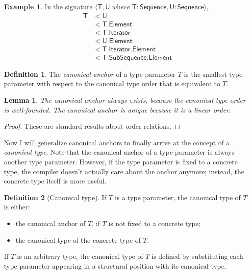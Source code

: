 \documentclass[headsepline,bibliography=totoc]{scrreport}
\newcommand{\namesym}[1]{\mathsf{#1}}
\newcommand{\genericparam}[1]{\bm{\mathsf{#1}}}
\newcommand{\proto}[1]{\bm{\mathsf{#1}}}
\newcommand{\gensig}[2]{\langle #1\;\textit{where}\;#2\rangle}
\newtheorem{lemma}{Lemma}[chapter]
\theoremstyle{definition}
\newtheorem{example}{Example}[chapter]
\theoremstyle{definition}
\newtheorem{definition}{Definition}[chapter]
\theoremstyle{definition}
\begin{document}
\begin{example} In the signature
$\gensig{\genericparam{T},\genericparam{U}}
{\genericparam{T}\colon \proto{Sequence},
\genericparam{U}\colon \proto{Sequence}}$,
\begin{align*}
\genericparam{T}&<\genericparam{U}\\
&<\genericparam{T}.\namesym{Element}\\
&<\genericparam{T}.\namesym{Iterator}\\
&<\genericparam{U}.\namesym{Element}\\
&<\genericparam{T}.\namesym{Iterator}.\namesym{Element}\\
&<\genericparam{T}.\namesym{SubSequence}.\namesym{Element}
\end{align*}
\end{example}

\begin{definition}\label{canonicalanchor}The \emph{canonical anchor} of a type parameter $T$ is the smallest type parameter with respect to the canonical type order that is equivalent to $T$.
\end{definition}
\begin{lemma} The canonical anchor always exists, because the canonical type order is well-founded. The canonical anchor is unique because it is a linear order.
\end{lemma}
\begin{proof} These are standard results about order relations.\end{proof}

Now I will generalize canonical anchors to finally arrive at the concept of a \emph{canonical type}. Note that the canonical anchor of a type parameter is always another type parameter. However, if the type parameter is fixed to a concrete type, the compiler doesn't actually care about the anchor anymore; instead, the concrete type itself is more useful.

\begin{definition} [Canonical type]\label{canonicaltype} If $T$ is a type parameter, the canonical type of $T$ is either:
\begin{itemize}
\item the canonical anchor of $T$, if $T$ is not fixed to a concrete type;
\item the canonical type of the concrete type of $T$.
\end{itemize}

If $T$ is an arbitrary type, the canonical type of $T$ is defined by substituting each type parameter appearing in a structural position with its canonical type.
\end{definition}
\end{document}
